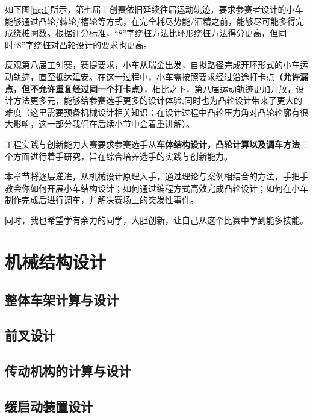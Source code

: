 \documentclass[lang=cn,newtx,14pt,scheme=chinese]{elegantbook}
\begin{document}
如下图\ref{fig:1}所示，第七届工创赛依旧延续往届运动轨迹，要求参赛者设计的小车能够通过凸轮/棘轮/槽轮等方式，在完全耗尽势能/酒精之前，能够尽可能多得完成绕桩圈数。根据评分标准，“8”字绕桩方法比环形绕桩方法得分更高，但同时“8”字绕桩对凸轮设计的要求也更高。

反观第八届工创赛，赛提要求，小车从瑞金出发，自拟路径完成开环形式的小车运动轨迹，直至抵达延安。在这一过程中，小车需按照要求经过沿途打卡点\textbf{（允许漏点，但不允许重复经过同一个打卡点）}，相比之下，第八届运动轨迹更加开放，设计方法更多元，能够给参赛选手更多的设计体验,同时也为凸轮设计带来了更大的难度（这里需要预备机械设计相关知识：在设计过程中凸轮压力角对凸轮轮廓有很大影响，这一部分我们在后续小节中会着重讲解）。

工程实践与创新能力大赛要求参赛选手从\textbf{车体结构设计，凸轮计算以及调车方法}三个方面进行着手研究，旨在综合培养选手的实践与创新能力。

本章节将逐层递进，从机械设计原理入手，通过理论与案例相结合的方法，手把手教会你如何开展小车结构设计；如何通过编程方式高效完成凸轮设计；如何在小车制作完成后进行调车，并解决赛场上的突发性事件。

同时，我也希望学有余力的同学，大胆创新，让自己从这个比赛中学到能多技能。

\section{机械结构设计}
\subsection{整体车架计算与设计}

\subsection{前叉设计}

\subsection{传动机构的计算与设计}

\subsection{缓启动装置设计}
\end{document}
